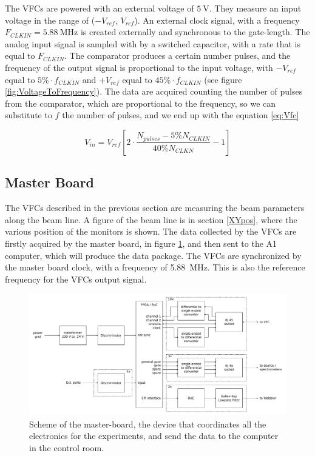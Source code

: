 The VFCs are powered with an external voltage of $\SI{5}{\volt}$. They measure an input voltage in the range of ($-V_{ref}$, $V_{ref}$). An external clock signal, with a frequency $F_{CLKIN} = \SI{5.88}{\mega \hertz}$ is created externally and synchronous to the gate-length.
The analog input signal is sampled with by a switched capacitor, with a rate that is equal to $F_{CLKIN}$.
The comparator produces a certain number pulses, and the frequency of the output signal is proportional to the input voltage, with $-V_{ref}$ equal to $5 \% \cdot f_{CLKIN}$ and $+V_{ref}$ equal to $45 \% \cdot f_{CLKIN}$ \cite{VfcDatasheet} (see figure \ref{fig:VoltageToFrequency}). The data are acquired counting the number of pulses from the comparator, which are proportional to the frequency, so we can substitute to $f$ the number of pulses, and we end up with the equation \ref{eq:Vfc}

\begin{equation} \label{eq:Vfc}
V_{in} =  V_{ref}[2 \cdot \dfrac{N_{pulses} - 5 \% N_{CLKIN}}{40 \% N_{CLKN}} - 1]
\end{equation}

\subsection{Master Board}

The VFCs described in the previous section are measuring the beam parameters along the beam line. A figure of the beam line is in section \ref{XYpos}, where the various position of the monitors is shown.
The data collected by the VFCs are firstly acquired by the master board, in figure \ref{fig:MasterBoard}, and then sent to the A1 computer, which will produce the data package. The VFCs are synchronized by the master board clock, with a frequency of \SI{5.88}{\mega \hertz}. This is also the reference frequency for the VFCs output signal. 

\begin{figure}[hbtp]
\centering
\includegraphics[width = \textwidth]{ExperimentalSetup/masterboard.pdf}
\caption{Scheme of the master-board, the device that coordinates all the electronics for the experiments, and send the data to the computer in the control room.}
\label{fig:MasterBoard}
\end{figure}

